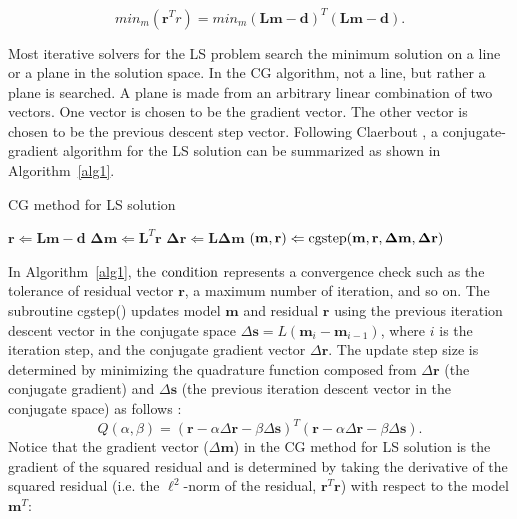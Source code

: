 \begin{equation}
 min_m ({\mathbf r^T r}) = min_m {(\mathbf L\mathbf m - \mathbf d)^T(\mathbf L\mathbf m - \mathbf d)} .
\end{equation}

Most iterative solvers for the LS problem search 
the minimum solution on a line or a plane in the solution space.
In the CG algorithm, not a line, but rather a plane is searched. 
A plane is made from an arbitrary linear combination of two vectors.
One vector is chosen to be the gradient vector.
The other vector is chosen to be the previous descent step vector.
Following Claerbout , 
a conjugate-gradient algorithm for the LS solution 
can be summarized as shown in Algorithm~\ref{alg1}.

\begin{algorithm}
\caption{ CG method for LS solution}
\label{alg1}
\begin{algorithmic}
\STATE $ {\mathbf r} \Leftarrow \mathbf L \mathbf m - \mathbf d $
\STATE $ \mathbf \Delta \mathbf m \Leftarrow \mathbf L^T \mathbf r $
\STATE $ \mathbf \Delta \mathbf r \Leftarrow \mathbf L \mathbf \Delta \mathbf m $
\STATE $ (\mathbf m, \mathbf r) \Leftarrow \rm cgstep(\mathbf m, \mathbf r, \mathbf \Delta \mathbf m, \mathbf \Delta \mathbf r)  $
\ENDWHILE
\end{algorithmic}
\end{algorithm}

In Algorithm~\ref{alg1}, the $\rm condition$ represents a convergence check
such as the tolerance of residual vector $\mathbf r$, 
a maximum number of iteration, and so on.
The subroutine {\mbox cgstep()} updates model $\mathbf m$ and residual $\mathbf r$
using the previous iteration descent vector in the conjugate space 
$\Delta \mathbf s = L (\mathbf m_i - \mathbf m_{i-1})$, where $i$ is the iteration step,
and the conjugate gradient vector $\Delta \mathbf r$.
The update step size is determined by minimizing 
the quadrature function composed from 
$\Delta \mathbf r$ (the conjugate gradient) 
and $\Delta \mathbf s$ (the previous iteration descent vector in the conjugate space)
as follows \cite{ClaerPVI:92}:
$$Q(\alpha,\beta) = (\mathbf r-\alpha \Delta \mathbf r -\beta \Delta \mathbf s)^T
                    (\mathbf r-\alpha \Delta \mathbf r -\beta \Delta \mathbf s) .$$ 
Notice that
the gradient vector ($\Delta \mathbf m$) in the CG method for LS solution 
is the gradient of the squared residual 
and is determined by taking the derivative of the squared residual
(i.e. the $\ell^2$-norm of the residual, $\mathbf r^T \mathbf r$)
with respect to the model $\mathbf m^T$:

